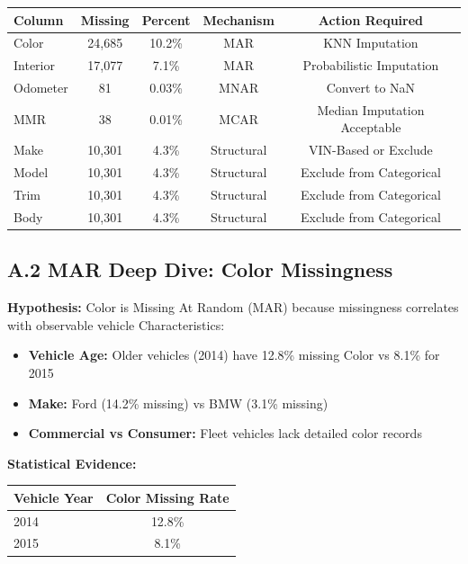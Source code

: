 \documentclass[12pt,a4paper]{article}
\begin{document}
\begin{center}
\begin{tabular}{lcccc}
\toprule
\textbf{Column} & \textbf{Missing} & \textbf{Percent} & \textbf{Mechanism} & \textbf{Action Required} \\
\midrule
Color & 24,685 & 10.2\% & MAR & KNN Imputation \\
Interior & 17,077 & 7.1\% & MAR & Probabilistic Imputation \\
Odometer & 81 & 0.03\% & MNAR & Convert to NaN \\
MMR & 38 & 0.01\% & MCAR & Median Imputation Acceptable \\
Make & 10,301 & 4.3\% & Structural & VIN-Based or Exclude \\
Model & 10,301 & 4.3\% & Structural & Exclude from Categorical \\
Trim & 10,301 & 4.3\% & Structural & Exclude from Categorical \\
Body & 10,301 & 4.3\% & Structural & Exclude from Categorical \\
\bottomrule
\end{tabular}
\end{center}

\subsection{A.2 MAR Deep Dive: Color Missingness}

\textbf{Hypothesis:} Color is Missing At Random (MAR) because missingness correlates with observable vehicle Characteristics:

\begin{itemize}
    \item \textbf{Vehicle Age:} Older vehicles (2014) have 12.8\% missing Color vs 8.1\% for 2015
    \item \textbf{Make:} Ford (14.2\% missing) vs BMW (3.1\% missing)
    \item \textbf{Commercial vs Consumer:} Fleet vehicles lack detailed color records
\end{itemize}

\textbf{Statistical Evidence:}
\begin{center}
\begin{tabular}{lc}
\toprule
\textbf{Vehicle Year} & \textbf{Color Missing Rate} \\
\midrule
2014 & 12.8\% \\
2015 & 8.1\% \\
\bottomrule
\end{tabular}
\end{center}
\end{document}
